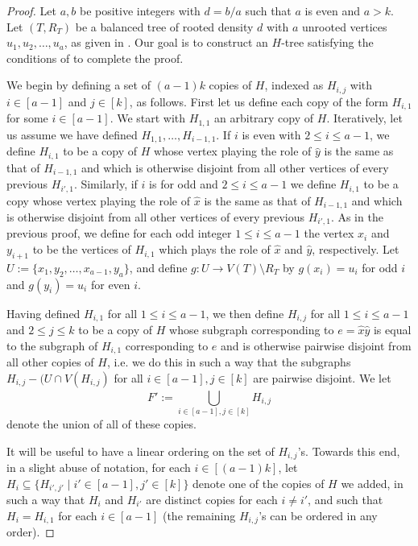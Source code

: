 \documentclass[12pt,letterpaper]{article}
\theoremstyle{definition}
\begin{document}
	\begin{proof}
		Let $a,b$ be positive integers with $d=b/a$ such that $a$ is even and $a>k$. Let $(T,R_T)$ be a balanced tree of rooted density $d$ with $a$ unrooted vertices $u_1,u_2,\dots,u_a$, as given in . Our goal is to construct an $H$-tree satisfying the conditions of  to complete the proof.
		
		We begin by defining a set of $(a-1)k$ copies of $H$, indexed as $H_{i,j}$ with $i\in [a-1]$ and $j\in [k]$, as follows. First let us define each copy of the form $H_{i,1}$ for some $i\in [a-1]$. We start with $H_{1,1}$ an arbitrary copy of $H$. Iteratively, let us assume we have defined $H_{1,1},\ldots,H_{i-1,1}$. If $i$ is even with $2\le i\le a-1$, we define $H_{i,1}$ to be a copy of $H$ whose vertex playing the role of $\hat{y}$ is the same as that of $H_{i-1,1}$ and which is otherwise disjoint from all other vertices of every previous $H_{i',1}$.  Similarly, if $i$ is for odd and $2\le i\le a-1$ we define $H_{i,1}$ to be a copy whose vertex playing the role of $\hat{x}$ is the same as that of $H_{i-1,1}$ and which is otherwise disjoint from all other vertices of every previous $H_{i',1}$.   As in the previous proof, we define for each odd integer $1\le i\le a-1$ the vertex $x_i$ and $y_{i+1}$ to be the vertices of $H_{i,1}$ which plays the role of $\hat{x}$ and $\hat{y}$, respectively.  Let $U:=\{x_1,y_2,\ldots,x_{a-1},y_a\}$, and define $g:U \to V(T)\setminus R_T$ by $g(x_i)=u_i$ for odd $i$ and $g(y_i)=u_i$ for even $i$. 
		
		Having defined $H_{i,1}$ for all $1\le i\le a-1$, we then define $H_{i,j}$ for all $1\le i\le a-1$ and $2\le j\le k$ to be a copy of $H$ whose subgraph corresponding to $e=\hat{x}\hat{y}$ is equal to the subgraph of $H_{i,1}$ corresponding to $e$ and is otherwise pairwise disjoint from all other copies of $H$, i.e. we do this in such a way that the subgraphs $H_{i,j}-(U\cap V(H_{i,j})$ for all $i\in [a-1],j\in [k]$ are pairwise disjoint. We let 
		\[
		F':=\bigcup_{i\in [a-1],j\in [k]}^{}H_{i,j}
		\]
		denote the union of all of these copies. 
		
		It will be useful to have a linear ordering on the set of $H_{i,j}$'s. Towards this end, in a slight abuse of notation, for each $i\in [(a-1)k]$, let $H_i\subseteq \{H_{i',j'}\mid i'\in [a-1],j'\in [k]\}$ denote one of the copies of $H$ we added, in such a way that $H_i$ and $H_{i'}$ are distinct copies for each $i\neq i'$, and such that $H_i=H_{i,1}$ for each $i\in [a-1]$ (the remaining $H_{i,j}$'s can be ordered in any order).
		

\end{proof}
\end{document}
